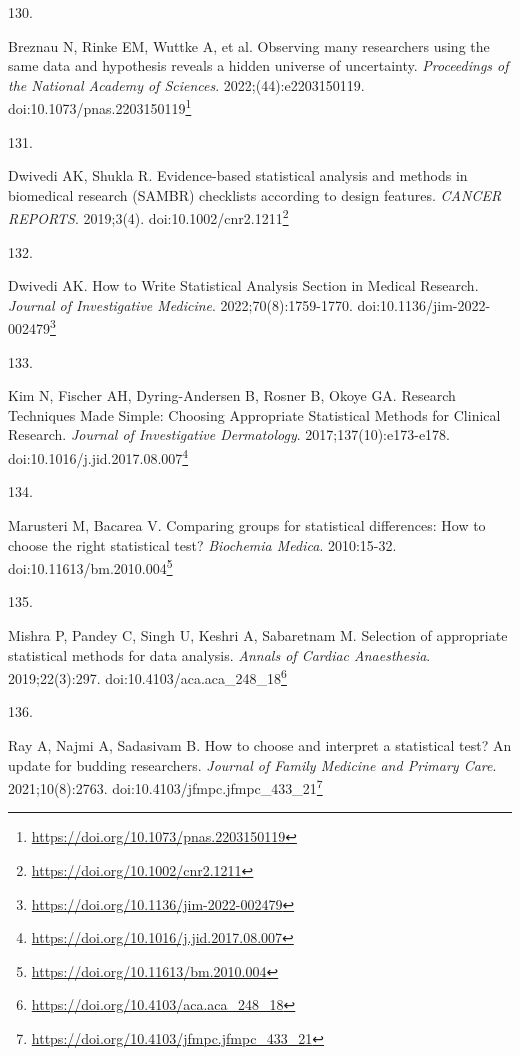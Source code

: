 \documentclass[
  a4paper,
]{book}
\newlength{\cslhangindent}
\newlength{\csllabelwidth}
\newlength{\cslentryspacingunit} %
\newenvironment{CSLReferences}[2] %
 {%
  \setlength{\parindent}{0pt}
  \ifodd #1
  \let\oldpar\par
  \def\par{\hangindent=\cslhangindent\oldpar}
  \fi
  \setlength{\parskip}{#2\cslentryspacingunit}
 }%
 {}
\newcommand{\CSLLeftMargin}[1]{\parbox[t]{\csllabelwidth}{#1}}
\newcommand{\CSLRightInline}[1]{\parbox[t]{\linewidth - \csllabelwidth}{#1}\break}
\renewcommand{\href}[2]{#2\footnote{\url{#1}}}
\begin{document}
\begin{CSLReferences}{0}{0}
\leavevmode{}%
\CSLLeftMargin{130. }%
\CSLRightInline{Breznau N, Rinke EM, Wuttke A, et al. Observing many researchers using the same data and hypothesis reveals a hidden universe of uncertainty. \emph{Proceedings of the National Academy of Sciences}. 2022;(44):e2203150119. doi:\href{https://doi.org/10.1073/pnas.2203150119}{10.1073/pnas.2203150119}}

\leavevmode{}%
\CSLLeftMargin{131. }%
\CSLRightInline{Dwivedi AK, Shukla R. Evidence{-}based statistical analysis and methods in biomedical research (SAMBR) checklists according to design features. \emph{CANCER REPORTS}. 2019;3(4). doi:\href{https://doi.org/10.1002/cnr2.1211}{10.1002/cnr2.1211}}

\leavevmode{}%
\CSLLeftMargin{132. }%
\CSLRightInline{Dwivedi AK. How to Write Statistical Analysis Section in Medical Research. \emph{Journal of Investigative Medicine}. 2022;70(8):1759-1770. doi:\href{https://doi.org/10.1136/jim-2022-002479}{10.1136/jim-2022-002479}}

\leavevmode{}%
\CSLLeftMargin{133. }%
\CSLRightInline{Kim N, Fischer AH, Dyring-Andersen B, Rosner B, Okoye GA. Research Techniques Made Simple: Choosing Appropriate Statistical Methods for Clinical Research. \emph{Journal of Investigative Dermatology}. 2017;137(10):e173-e178. doi:\href{https://doi.org/10.1016/j.jid.2017.08.007}{10.1016/j.jid.2017.08.007}}

\leavevmode{}%
\CSLLeftMargin{134. }%
\CSLRightInline{Marusteri M, Bacarea V. Comparing groups for statistical differences: How to choose the right statistical test? \emph{Biochemia Medica}. 2010:15-32. doi:\href{https://doi.org/10.11613/bm.2010.004}{10.11613/bm.2010.004}}

\leavevmode{}%
\CSLLeftMargin{135. }%
\CSLRightInline{Mishra P, Pandey C, Singh U, Keshri A, Sabaretnam M. Selection of appropriate statistical methods for data analysis. \emph{Annals of Cardiac Anaesthesia}. 2019;22(3):297. doi:\href{https://doi.org/10.4103/aca.aca_248_18}{10.4103/aca.aca\_248\_18}}

\leavevmode{}%
\CSLLeftMargin{136. }%
\CSLRightInline{Ray A, Najmi A, Sadasivam B. How to choose and interpret a statistical test? An update for budding researchers. \emph{Journal of Family Medicine and Primary Care}. 2021;10(8):2763. doi:\href{https://doi.org/10.4103/jfmpc.jfmpc_433_21}{10.4103/jfmpc.jfmpc\_433\_21}}


\end{CSLReferences}
\end{document}
